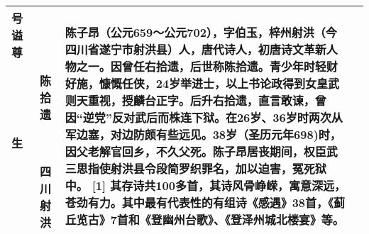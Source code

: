 \begin{longtable}{|>{\centering\namefont\heiti}m{2em}|>{\centering\tiny}m{3.0em}|>{\xzfont\kaiti}m{7.3em}|}
\begin{description}
    \item[号] 
    \item[谥] 
    \item[尊] 陈拾遗
    \item[生] 四川射洪
    \end{description} & 陈子昂（公元659～公元702），字伯玉，梓州射洪（今四川省遂宁市射洪县）人，唐代诗人，初唐诗文革新人物之一。因曾任右拾遗，后世称陈拾遗。青少年时轻财好施，慷慨任侠，24岁举进士，以上书论政得到女皇武则天重视，授麟台正字。后升右拾遗，直言敢谏，曾因“逆党”反对武后而株连下狱。在26岁、36岁时两次从军边塞，对边防颇有些远见。38岁（圣历元年698)时，因父老解官回乡，不久父死。陈子昂居丧期间，权臣武三思指使射洪县令段简罗织罪名，加以迫害，冤死狱中。 [1]  其存诗共100多首，其诗风骨峥嵘，寓意深远，苍劲有力。其中最有代表性的有组诗《感遇》38首，《蓟丘览古》7首和《登幽州台歌》、《登泽州城北楼宴》等。 \tabularnewline\hline
  
  \bottomrule
\end{longtable}


